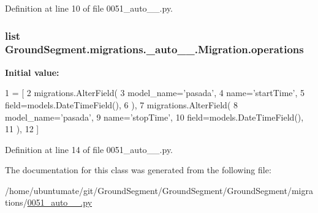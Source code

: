 Definition at line 10 of file 0051\+\_\+auto\+\_\+\_.\+py.

\hypertarget{class_ground_segment_1_1migrations_1_10051__auto__20170313__1436_1_1_migration_a2b9e3dabb7814738ca71bc05e4a23c67}{}
\subsubsection[{operations}]{\setlength{\rightskip}{0pt plus 5cm}list Ground\+Segment.\+migrations.\+\_\+auto\+\_\+\_.\+Migration.\+operations\hspace{0.3cm}{\ttfamily [static]}}\label{class_ground_segment_1_1migrations_1_10051__auto__20170313__1436_1_1_migration_a2b9e3dabb7814738ca71bc05e4a23c67}
{\bfseries Initial value\+:}
\begin{DoxyCode}
1 = [
2         migrations.AlterField(
3             model\_name=\textcolor{stringliteral}{'pasada'},
4             name=\textcolor{stringliteral}{'startTime'},
5             field=models.DateTimeField(),
6         ),
7         migrations.AlterField(
8             model\_name=\textcolor{stringliteral}{'pasada'},
9             name=\textcolor{stringliteral}{'stopTime'},
10             field=models.DateTimeField(),
11         ),
12     ]
\end{DoxyCode}


Definition at line 14 of file 0051\+\_\+auto\+\_\+\_.\+py.



The documentation for this class was generated from the following file\+:\begin{DoxyCompactItemize}
\item 
/home/ubuntumate/git/\+Ground\+Segment/\+Ground\+Segment/\+Ground\+Segment/migrations/\hyperlink{0051__auto__20170313__1436_8py}{0051\+\_\+auto\+\_\+\_.\+py}\end{DoxyCompactItemize}
